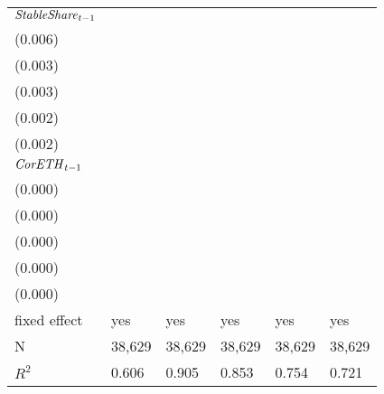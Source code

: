 \begin{tabular}{llllll}
${{\it StableShare}}_{t-1}$  &  \makecell{$0.226^{***}$ \\ (0.006)} &    \makecell{$-0.005^{}$ \\ (0.003)} &  \makecell{$-0.010^{***}$ \\ (0.003)} &  \makecell{$0.059^{***}$ \\ (0.002)} &   \makecell{$0.036^{***}$ \\ (0.002)} \\
${{\it CorETH}}_{t-1}$       &    \makecell{$-0.000^{}$ \\ (0.000)} &     \makecell{$0.000^{}$ \\ (0.000)} &      \makecell{$0.000^{}$ \\ (0.000)} &    \makecell{$0.000^{*}$ \\ (0.000)} &      \makecell{$0.000^{}$ \\ (0.000)} \\
\midrule fixed effect        &                                  yes &                                  yes &                                   yes &                                  yes &                                   yes \\
N                            &                               38,629 &                               38,629 &                                38,629 &                               38,629 &                                38,629 \\
$R^2$                        &                                0.606 &                                0.905 &                                 0.853 &                                0.754 &                                 0.721 \\
\bottomrule
\end{tabular}
